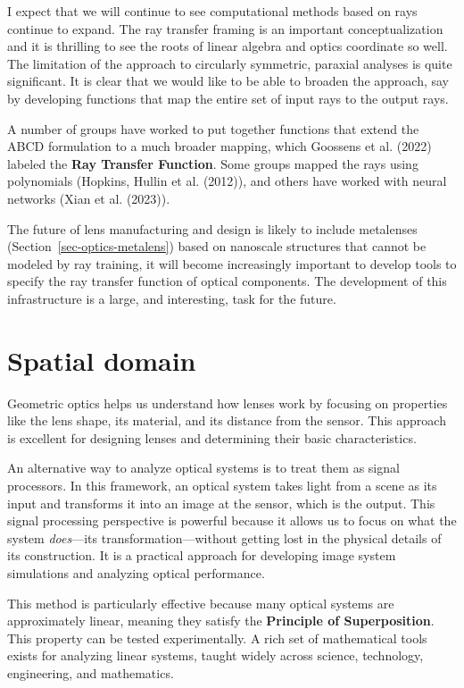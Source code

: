 \documentclass[
  letterpaper,
]{book}
\begin{document}
I expect that we will continue to see computational methods based on
rays continue to expand. The ray transfer framing is an important
conceptualization and it is thrilling to see the roots of linear algebra
and optics coordinate so well. The limitation of the approach to
circularly symmetric, paraxial analyses is quite significant. It is
clear that we would like to be able to broaden the approach, say by
developing functions that map the entire set of input rays to the output
rays.

A number of groups have worked to put together functions that extend the
ABCD formulation to a much broader mapping, which Goossens et al. (2022)
labeled the \textbf{Ray Transfer Function}. Some groups mapped the rays
using polynomials (Hopkins, Hullin et al. (2012)), and others have
worked with neural networks (Xian et al. (2023)).

The future of lens manufacturing and design is likely to include
metalenses (Section~\ref{sec-optics-metalens}) based on nanoscale
structures that cannot be modeled by ray training, it will become
increasingly important to develop tools to specify the ray transfer
function of optical components. The development of this infrastructure
is a large, and interesting, task for the future.

\chapter{Spatial domain}\label{sec-optics-linear-space}

Geometric optics helps us understand how lenses work by focusing on
properties like the lens shape, its material, and its distance from the
sensor. This approach is excellent for designing lenses and determining
their basic characteristics.

An alternative way to analyze optical systems is to treat them as signal
processors. In this framework, an optical system takes light from a
scene as its input and transforms it into an image at the sensor, which
is the output. This signal processing perspective is powerful because it
allows us to focus on what the system \emph{does}---its
transformation---without getting lost in the physical details of its
construction. It is a practical approach for developing image system
simulations and analyzing optical performance.

This method is particularly effective because many optical systems are
approximately linear, meaning they satisfy the \textbf{Principle of
Superposition}. This property can be tested experimentally. A rich set
of mathematical tools exists for analyzing linear systems, taught widely
across science, technology, engineering, and mathematics.
\end{document}
